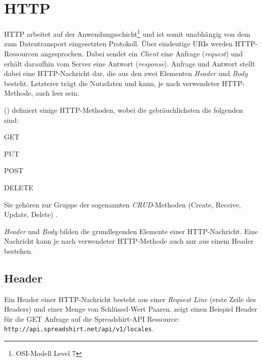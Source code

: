 \section{HTTP}
\label{sec:http}


HTTP arbeitet auf der Anwendungsschicht\footnote{OSI-Modell Level 7} und ist somit unabhängig von dem zum Datentransport eingesetzten Protokoll. 
Über eindeutige \glspl{URI} werden HTTP-Ressourcen angesprochen. Dabei sendet ein \emph{Client} eine Anfrage (\emph{request}) und erhält daraufhin vom Server eine Antwort (\emph{response}). Anfrage und Antwort stellt dabei eine HTTP-Nachricht dar, die aus den zwei Elementen \emph{Header} und \emph{Body} besteht. Letzterer trägt die Nutzdaten und kann, je nach verwendeter HTTP-Methode, auch leer sein.

 (\cite{rfc2616}) definiert einige HTTP-Methoden, wobei die gebräuchlichsten die folgenden sind:
\begin{compactitem}
    \item GET
    \item PUT
    \item POST
    \item DELETE
\end{compactitem}

Sie gehören zur Gruppe der sogenannten \emph{CRUD}-Methoden (Create, Receive, Update, Delete) .

\emph{Header} und \emph{Body} bilden die grundlegenden Elemente einer HTTP-Nachricht. 
Eine Nachricht kann je nach verwendeter HTTP-Methode auch nur aus einem Header bestehen.

\subsection{Header}
\label{sec:http-header}

Ein Header einer HTTP-Nachricht besteht aus einer \emph{Request Line} (erste Zeile des Headers) und einer Menge von Schlüssel-Wert Paaren.  zeigt einen Beispiel Header für die GET Anfrage auf die Spreadshirt-API Ressource:\\
\texttt{http://api.spreadshirt.net/api/v1/locales}.


